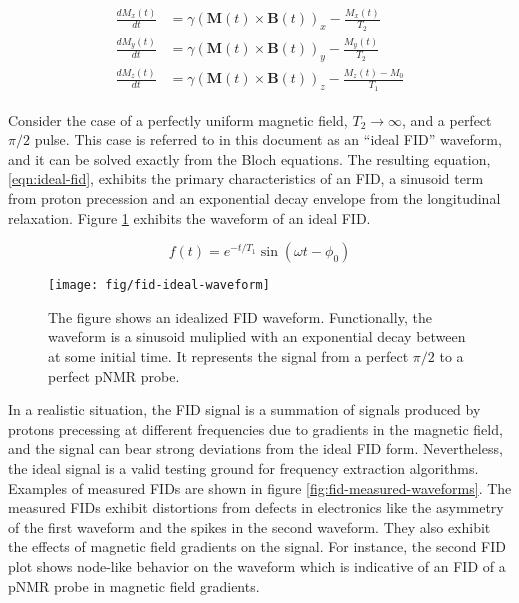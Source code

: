 \begin{align}
\begin{split}
\label{eqn:bloch}
\frac{dM_x(t)}{dt} & = \gamma (\mathbf{M}(t) \times \mathbf{B}(t))_x - \frac{M_x(t)}{T_2} \\
\frac{dM_y(t)}{dt} & = \gamma (\mathbf{M}(t)\times \mathbf{B}(t))_y - \frac{M_y(t)}{T_2} \\
\frac{dM_z(t)}{dt} & = \gamma (\mathbf{M}(t) \times \mathbf{B}(t))_z - \frac{M_z(t) - M_0}{T_1}
\end{split} 
\end{align}

Consider the case of a perfectly uniform magnetic field, $T_2 \rightarrow \infty$, and a perfect $\pi/2$ pulse. This case is referred to in this document as an ``ideal FID'' waveform, and it can be solved exactly from the Bloch equations.  The resulting equation, \ref{eqn:ideal-fid}, exhibits the primary characteristics of an FID, a sinusoid term from proton precession and an exponential decay envelope from the longitudinal relaxation.  Figure \ref{fig:fid-ideal-waveform} exhibits the waveform of an ideal FID.

\begin{equation}
f(t) = e^{-t/T_1} \sin(\omega t - \phi_0)
\label{eqn:ideal-fid}
\end{equation}

\begin{figure}
\centering
\texttt{[image: fig/fid-ideal-waveform]}
\caption{
    The figure shows an idealized FID waveform. Functionally, the waveform is a sinusoid muliplied with an exponential decay between at some initial time.  It represents the signal from a perfect $\pi/2$ to a perfect pNMR probe.
    \label{fig:fid-ideal-waveform}
}
\end{figure}

In a realistic situation, the FID signal is a summation of signals produced by protons precessing at different frequencies due to gradients in the magnetic field, and the signal can bear strong deviations from the ideal FID form.  Nevertheless, the ideal signal is a valid testing ground for frequency extraction algorithms.  Examples of measured FIDs are shown in figure \ref{fig:fid-measured-waveforms}.  The measured FIDs exhibit distortions from defects in electronics like the asymmetry of the first waveform and the spikes in the second waveform.  They also exhibit the effects of magnetic field gradients on the signal.  For instance, the second FID plot shows node-like behavior on the waveform which is indicative of an FID of a pNMR probe in magnetic field gradients.

